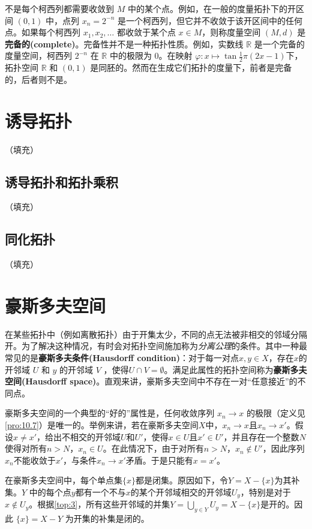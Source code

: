 \begin{theorem}
\begin{theorem}
\begin{eg}\label{eg:10.11}
	不是每个柯西列都需要收敛到 $M$ 中的某个点。例如，在一般的度量拓扑下的开区间 $(0,1)$ 中，点列 $x_{n} =2^{-n}$ 是一个柯西列，但它并不收敛于该开区间中的任何点。如果每个柯西列 $x_{1} ,x_{2} ,\dotsc $ 都收敛于某个点 $x\in M$，则称度量空间 $(M,d)$ 是\textbf{完备的(complete)}。完备性并不是一种拓扑性质。例如，实数线 $\mathbb{R}$ 是一个完备的度量空间，柯西列 $2^{-n}$ 在 $\mathbb{R}$ 中的极限为 0。在映射 $\varphi :x\mapsto \tan\frac{1}{2} \pi (2x-1)$下，拓扑空间 $\mathbb{R}$ 和 $(0,1)$ 是同胚的。然而在生成它们拓扑的度量下，前者是完备的，后者则不是。
\end{eg}

\section{诱导拓扑}
（填充）
\subsection{诱导拓扑和拓扑乘积}
（填充）
\subsection{同化拓扑}
（填充）
\section{豪斯多夫空间}

在某些拓扑中（例如离散拓扑）由于开集太少，不同的点无法被非相交的邻域分隔开。为了解决这种情况，有时会对拓扑空间施加称为\emph{分离公理}的条件。其中一种最常见的是\textbf{豪斯多夫条件(Hausdorff condition)}：对于每一对点$x,y\in X$，存在$x$的开邻域 $U$ 和 $y$ 的开邻域 $V$ ，使得$U\cap V=\emptyset $。满足此属性的拓扑空间称为\textbf{豪斯多夫空间(Hausdorff space)}。直观来讲，豪斯多夫空间中不存在一对“任意接近”的不同点。

豪斯多夫空间的一个典型的“好的”属性是，任何收敛序列 $x_{n}\rightarrow x$ 的极限（定义见\ref{pro:10.7}）是唯一的。举例来讲，若在豪斯多夫空间$X$中，$x_{n}\rightarrow x$且$x_{n}\rightarrow x'$。假设$x\neq x'$，给出不相交的开邻域$U$和$U'$，使得$x\in U$且$x'\in U'$，并且存在一个整数$N$使得对所有$n >N$，$x_{n} \in U$。在此情况下，由于对所有$n >N$，$x_{n} \notin U'$，因此序列$x_{n}$不能收敛于$x'$，与条件$x_{n}\rightarrow x'$矛盾。于是只能有$x=x'$。

在豪斯多夫空间中，每个单点集$\{x\}$都是闭集。原因如下，令$Y=X-\{x\}$为其补集。$Y$ 中的每个点$y$都有一个不与$x$的某个开邻域相交的开邻域$U_{y}$，特别是对于$x\notin U_{y}$。根据\ref{top:3}，所有这些开邻域的并集$Y=\bigcup _{y\in Y} U_{y} =X-\{x\}$是开的。因此 $\{x\}=X-Y$ 为开集的补集是闭的。


\end{theorem}
\end{theorem}

